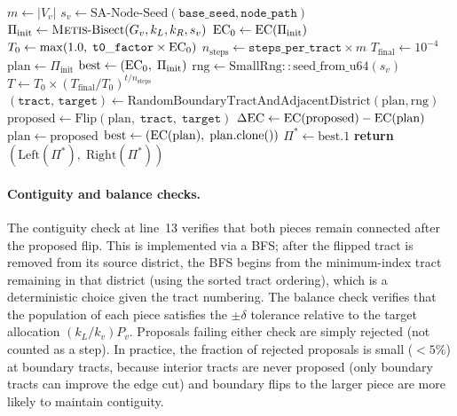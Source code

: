 \begin{algorithm}[t]
\caption{\sa{}-\textsc{Bisect}($G_v$, $k_L$, $k_R$, $\mathtt{base\_seed}$,
  $\mathtt{node\_path}$, $\mathtt{steps\_per\_tract}$, $\mathtt{t0\_factor}$)}
\label{alg:sa}
\begin{algorithmic}[1]
\State $m \gets |V_v|$
\State $s_v \gets \mathrm{SA\text{-}Node\text{-}Seed}(\mathtt{base\_seed},
       \mathtt{node\_path})$ 
\State $\Pi_{\mathrm{init}} \gets \textsc{Metis}\text{-}\mathrm{Bisect}(G_v, k_L, k_R, s_v)$
\State $\mathrm{EC}_0 \gets \mathrm{EC}(\Pi_{\mathrm{init}})$
\State $T_0 \gets \max(1.0,\; \mathtt{t0\_factor} \times \mathrm{EC}_0)$
\State $n_{\mathrm{steps}} \gets \mathtt{steps\_per\_tract} \times m$
\State $T_{\mathrm{final}} \gets 10^{-4}$
\State $\mathrm{plan} \gets \Pi_{\mathrm{init}}$
\State $\mathrm{best} \gets (\mathrm{EC}_0,\; \Pi_{\mathrm{init}})$
\State $\mathrm{rng} \gets \mathrm{SmallRng::seed\_from\_u64}(s_v)$
  \State $T \gets T_0 \times (T_{\mathrm{final}} / T_0)^{t / n_{\mathrm{steps}}}$
  \State $(\mathtt{tract},\, \mathtt{target}) \gets
         \mathrm{RandomBoundaryTractAndAdjacentDistrict}(\mathrm{plan}, \mathrm{rng})$
  \State $\mathrm{proposed} \gets \mathrm{Flip}(\mathrm{plan},\;
         \mathtt{tract},\; \mathtt{target})$
    \State $\Delta\mathrm{EC} \gets \mathrm{EC}(\mathrm{proposed}) - \mathrm{EC}(\mathrm{plan})$
      \State $\mathrm{plan} \gets \mathrm{proposed}$
        \State $\mathrm{best} \gets (\mathrm{EC}(\mathrm{plan}),\; \mathrm{plan}.\mathrm{clone}())$
      \EndIf
    \EndIf
  \EndIf
\EndFor
\State $\Pi^* \gets \mathrm{best}.1$
\State \textbf{return} $(\mathrm{Left}(\Pi^*),\; \mathrm{Right}(\Pi^*))$
\end{algorithmic}
\end{algorithm}

\paragraph{Contiguity and balance checks.}
The contiguity check at line~13 verifies that both pieces remain connected
after the proposed flip.
This is implemented via a BFS; after the flipped tract is removed from its
source district, the BFS begins from the minimum-index tract remaining in
that district (using the sorted tract ordering), which is a deterministic
choice given the tract numbering.
The balance check verifies that the population of each piece satisfies the
$\pm\delta$ tolerance relative to the target allocation $(k_L / k_v) P_v$.
Proposals failing either check are simply rejected (not counted as a step).
In practice, the fraction of rejected proposals is small ($<5\%$) at
boundary tracts, because interior tracts are never proposed (only boundary
tracts can improve the edge cut) and boundary flips to the larger piece
are more likely to maintain contiguity.

